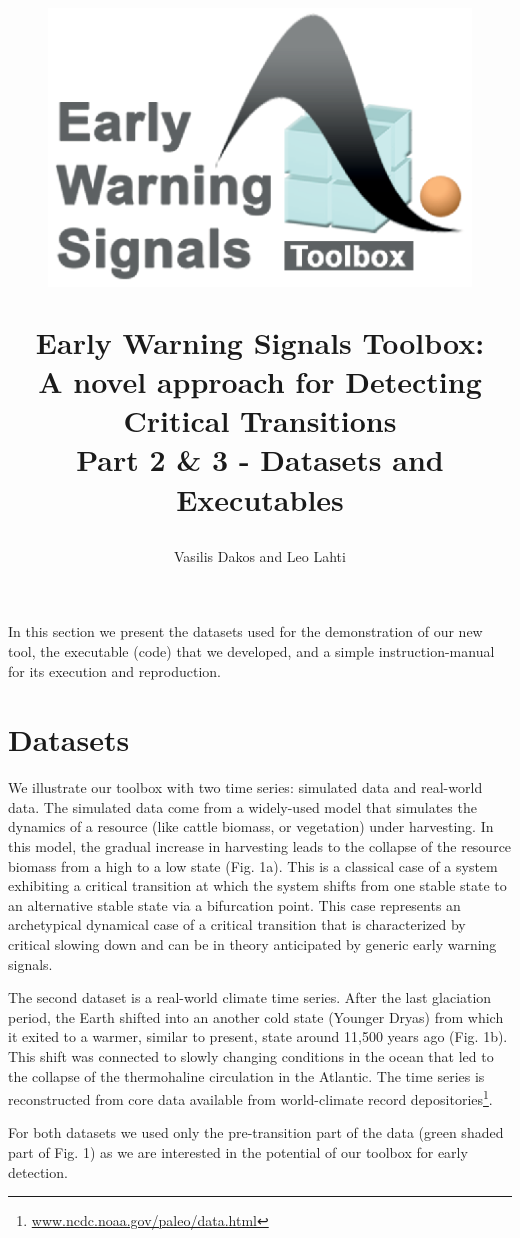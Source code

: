 \documentclass[12pt,a4paper,final]{article}
\author{Vasilis Dakos and Leo Lahti}
\title{
\begin{figure}[h]
\includegraphics[scale=0.55]{logoEWS.eps}
\end{figure}
Early Warning Signals Toolbox:\\ 
A novel approach for Detecting Critical Transitions\\
Part 2 \& 3 - Datasets and Executables
}
\begin{document}
\maketitle

\begin{doublespacing}

In this section we present the datasets used for the demonstration of our new tool, the executable (code) that we developed, and a simple instruction-manual for its execution and reproduction. 

\section{Datasets}
We illustrate our toolbox with two time series: simulated data and real-world data. The simulated data come from a widely-used model that simulates the dynamics of a resource (like cattle biomass,  or vegetation) under harvesting. In this model, the gradual increase in harvesting leads to the collapse of the resource biomass from a high to a low state (Fig. 1a). This is a classical case of a system exhibiting a critical transition at which the system shifts from one stable state to an alternative stable state via a bifurcation point. This case represents an archetypical dynamical case of a critical transition that is characterized by critical slowing down and can be in theory anticipated by generic early warning signals.

The second dataset is a real-world climate time series. After the last glaciation period, the Earth shifted into an another cold state (Younger Dryas) from which it exited to a warmer, similar to present, state around 11,500 years ago (Fig. 1b). This shift was connected to slowly changing conditions in the ocean that led to the collapse of the thermohaline circulation in the Atlantic. The time series is reconstructed from core data available from world-climate record depositories\footnote{\url{www.ncdc.noaa.gov/paleo/data.html}}.

For both datasets we used only the pre-transition part of the data (green shaded part of Fig. 1) as we are interested in the potential of our toolbox for early detection.


\end{doublespacing}
\end{document}
